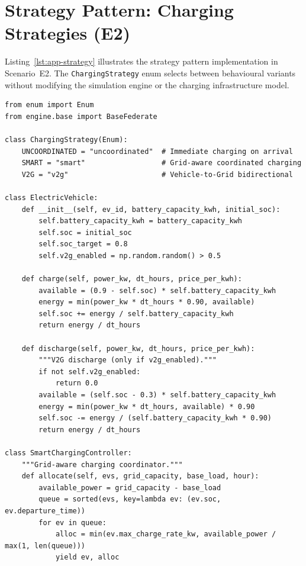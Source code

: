 \section{Strategy Pattern: Charging Strategies (E2)}
\label{sec:code-strategy}

Listing~\ref{lst:app-strategy} illustrates the strategy pattern implementation in Scenario~E2. The \texttt{ChargingStrategy} enum selects between behavioural variants without modifying the simulation engine or the charging infrastructure model.

\begin{listing}[H]
\begin{verbatim}
from enum import Enum
from engine.base import BaseFederate

class ChargingStrategy(Enum):
    UNCOORDINATED = "uncoordinated"  # Immediate charging on arrival
    SMART = "smart"                  # Grid-aware coordinated charging
    V2G = "v2g"                      # Vehicle-to-Grid bidirectional

class ElectricVehicle:
    def __init__(self, ev_id, battery_capacity_kwh, initial_soc):
        self.battery_capacity_kwh = battery_capacity_kwh
        self.soc = initial_soc
        self.soc_target = 0.8
        self.v2g_enabled = np.random.random() > 0.5

    def charge(self, power_kw, dt_hours, price_per_kwh):
        available = (0.9 - self.soc) * self.battery_capacity_kwh
        energy = min(power_kw * dt_hours * 0.90, available)
        self.soc += energy / self.battery_capacity_kwh
        return energy / dt_hours

    def discharge(self, power_kw, dt_hours, price_per_kwh):
        """V2G discharge (only if v2g_enabled)."""
        if not self.v2g_enabled:
            return 0.0
        available = (self.soc - 0.3) * self.battery_capacity_kwh
        energy = min(power_kw * dt_hours, available) * 0.90
        self.soc -= energy / (self.battery_capacity_kwh * 0.90)
        return energy / dt_hours

class SmartChargingController:
    """Grid-aware charging coordinator."""
    def allocate(self, evs, grid_capacity, base_load, hour):
        available_power = grid_capacity - base_load
        queue = sorted(evs, key=lambda ev: (ev.soc, ev.departure_time))
        for ev in queue:
            alloc = min(ev.max_charge_rate_kw, available_power / max(1, len(queue)))
            yield ev, alloc


\end{verbatim}
\end{listing}

